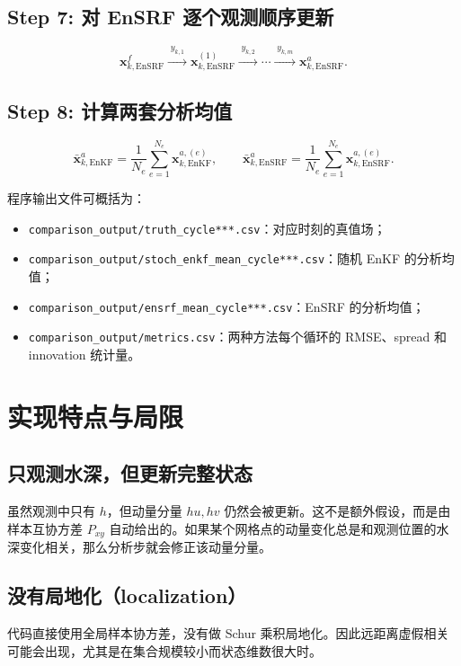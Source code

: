 \documentclass[12pt,a4paper]{article}
\begin{document}
\subsection*{Step 7: 对 EnSRF 逐个观测顺序更新}
\[
\mathbf{x}^{f}_{k,\mathrm{EnSRF}}
\xrightarrow{\;y_{k,1}\;}
\mathbf{x}^{(1)}_{k,\mathrm{EnSRF}}
\xrightarrow{\;y_{k,2}\;}
\cdots
\xrightarrow{\;y_{k,m}\;}
\mathbf{x}^{a}_{k,\mathrm{EnSRF}}.
\]

\subsection*{Step 8: 计算两套分析均值}
\[
\bar{\mathbf{x}}^a_{k,\mathrm{EnKF}}
= \frac{1}{N_e}\sum_{e=1}^{N_e}\mathbf{x}^{a,(e)}_{k,\mathrm{EnKF}},
\qquad
\bar{\mathbf{x}}^a_{k,\mathrm{EnSRF}}
= \frac{1}{N_e}\sum_{e=1}^{N_e}\mathbf{x}^{a,(e)}_{k,\mathrm{EnSRF}}.
\]

程序输出文件可概括为：
\begin{itemize}
    \item \texttt{comparison\_output/truth\_cycle***.csv}：对应时刻的真值场；
    \item \texttt{comparison\_output/stoch\_enkf\_mean\_cycle***.csv}：随机 EnKF 的分析均值；
    \item \texttt{comparison\_output/ensrf\_mean\_cycle***.csv}：EnSRF 的分析均值；
    \item \texttt{comparison\_output/metrics.csv}：两种方法每个循环的 RMSE、spread 和 innovation 统计量。
\end{itemize}

\section{实现特点与局限}

\subsection{只观测水深，但更新完整状态}

虽然观测中只有 $h$，但动量分量 $hu,hv$ 仍然会被更新。这不是额外假设，而是由样本互协方差 $P_{xy}$ 自动给出的。如果某个网格点的动量变化总是和观测位置的水深变化相关，那么分析步就会修正该动量分量。

\subsection{没有局地化（localization）}

代码直接使用全局样本协方差，没有做 Schur 乘积局地化。因此远距离虚假相关可能会出现，尤其是在集合规模较小而状态维数很大时。
\end{document}

